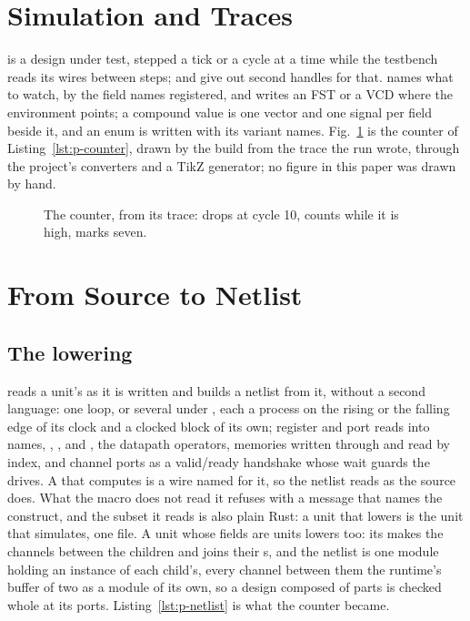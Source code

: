 \documentclass[journal,9pt]{IEEEtran}
\begin{document}
\section{Simulation and Traces}
\label{sec:p-sim}

 is a design under
test, stepped a tick or a cycle at a time while the testbench reads
its wires between steps;  and  give out second
handles for that.  names what to watch, by the
field names  registered, and writes an FST or a
VCD where the environment points; a compound value is one vector and
one signal per field beside it, and an enum is written with its
variant names. Fig.~\ref{fig:p-counter} is the counter of
Listing~\ref{lst:p-counter}, drawn by the build from the trace the
run wrote, through the project's converters and a TikZ generator; no
figure in this paper was drawn by hand.

\begin{figure}[htbp]
\centering

\caption{The counter, from its trace:  drops at cycle 10,
 counts while it is high,  marks seven.}
\label{fig:p-counter}
\end{figure}

\section{From Source to Netlist}
\label{sec:p-lower}

\subsection{The lowering}

\code{\#[lower]} reads a unit's  as it is written and
builds a netlist from it, without a second language: one loop, or
several under , each a process on the rising or the
falling edge of its clock and a clocked block of its own; register
and port reads into names, , ,
 and , the datapath operators, memories
written through  and read by index, and channel ports as a
valid/ready handshake whose wait guards the drives. A  that
computes is a wire named for it, so the netlist reads as the source
does. What the macro does not read it refuses with a message that
names the construct, and the subset it reads is also plain Rust: a
unit that lowers is the unit that simulates, one file. A unit whose
fields are units lowers too: its  makes the channels
between the children and joins their s, and the netlist
is one module holding an instance of each child's, every channel
between them the runtime's buffer of two as a module of its own, so
a design composed of parts is checked whole at its ports.
Listing~\ref{lst:p-netlist} is what the counter became.
\end{document}

